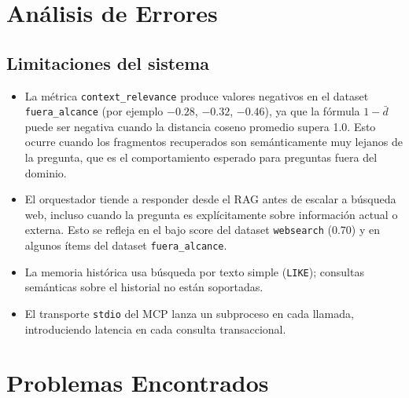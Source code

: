 \documentclass[conference]{IEEEtran}
\begin{document}
\section{Análisis de Errores}

\subsection{Limitaciones del sistema}

\begin{itemize}
    \item La métrica \texttt{context\_relevance} produce valores negativos en el dataset \texttt{fuera\_alcance} (por ejemplo $-0.28$, $-0.32$, $-0.46$), ya que la fórmula $1 - \bar{d}$ puede ser negativa cuando la distancia coseno promedio supera 1.0. Esto ocurre cuando los fragmentos recuperados son semánticamente muy lejanos de la pregunta, que es el comportamiento esperado para preguntas fuera del dominio.
    \item El orquestador tiende a responder desde el RAG antes de escalar a búsqueda web, incluso cuando la pregunta es explícitamente sobre información actual o externa. Esto se refleja en el bajo score del dataset \texttt{websearch} (0.70) y en algunos ítems del dataset \texttt{fuera\_alcance}.
    \item La memoria histórica usa búsqueda por texto simple (\texttt{LIKE}); consultas semánticas sobre el historial no están soportadas.
    \item El transporte \texttt{stdio} del MCP lanza un subproceso en cada llamada, introduciendo latencia en cada consulta transaccional.
\end{itemize}

\section{Problemas Encontrados}
\end{document}
